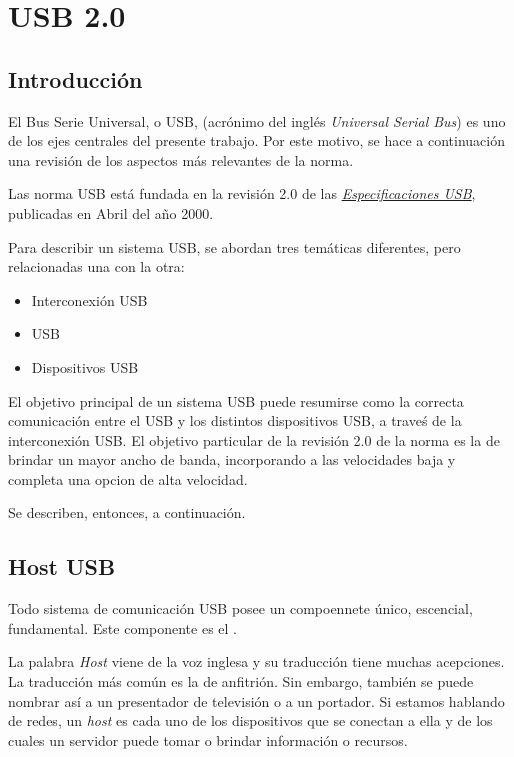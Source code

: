 \chapter{USB 2.0}

  \section{Introducción}
  El Bus Serie Universal, o USB, (acrónimo del inglés {\it Universal Serial Bus})
  es uno de los ejes centrales del presente trabajo. Por este motivo, se hace a
  continuación una revisión de los aspectos más relevantes de la norma.

  Las norma USB está fundada en la revisión 2.0 de las
  \href{www.usb.org}{\it Especificaciones USB}, publicadas en Abril del año 2000.

  Para describir un sistema USB, se abordan tres temáticas diferentes, pero
  relacionadas una con la otra:

  \begin{itemize}
    \item Interconexión USB
    \item \host USB
    \item Dispositivos USB
  \end{itemize}

  El objetivo principal de un sistema USB puede resumirse como la correcta
  comunicación entre el \host USB y los distintos dispositivos USB, a traveś de
  la interconexión USB. El objetivo particular de la revisión 2.0 de la norma es
  la de brindar un mayor ancho de banda, incorporando a las velocidades baja y
  completa una opcion de alta velocidad.

  Se describen, entonces, a continuación.

  \section{Host USB}
  Todo sistema de comunicación USB posee un compoennete único, escencial,
  fundamental. Este componente es el \host.

  La palabra {\it Host} viene de la voz inglesa y su traducción tiene muchas
  acepciones. La traducción más común es la de anfitrión. Sin embargo, también
  se puede nombrar así a un presentador de televisión o a un portador. Si
  estamos hablando de redes, un {\it host} es cada uno de los dispositivos que se
  conectan a ella y de los cuales un servidor puede tomar o brindar información
  o recursos.

